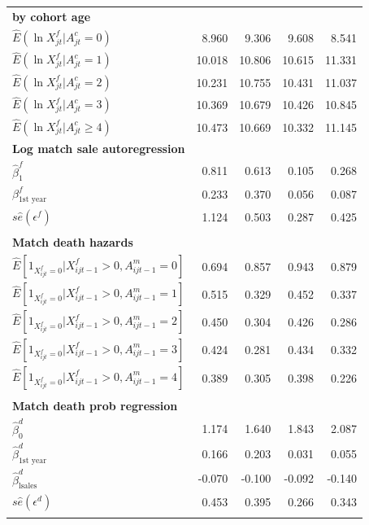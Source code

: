 \begin{small}
\begin{longtable}{l|rrrr}
\textbf{by cohort age } &  &  &  &  \\ 
$\widehat{E}(\ln X_{jt}^{f}|A_{jt}^{c}=0)$ & 8.960 & 9.306 & 9.608 & 8.541
\\ 
$\widehat{E}(\ln X_{jt}^{f}|A_{jt}^{c}=1)$ & 10.018 & 10.806 & 10.615 & 
11.331 \\ 
$\widehat{E}(\ln X_{jt}^{f}|A_{jt}^{c}=2)$ & 10.231 & 10.755 & 10.431 & 
11.037 \\ 
$\widehat{E}(\ln X_{jt}^{f}|A_{jt}^{c}=3)$ & 10.369 & 10.679 & 10.426 & 
10.845 \\ 
$\widehat{E}(\ln X_{jt}^{f}|A_{jt}^{c}\geq 4)$ & 10.473 & 10.669 & 10.332 & 
11.145 \\
\textbf{Log match sale autoregression} &  &  &  &  \\ 
$\widehat{\beta }_{1}^{f}$ & 0.811 & 0.613 & 0.105 & 0.268 \\ 
$\beta _{\mbox{1st
year}}^{f}$ & 0.233 & 0.370 & 0.056 & 0.087 \\ 
$s\widehat{e}(\epsilon ^{f})$ & 1.124 & 0.503 & 0.287 & 0.425 \\ 
&  &  &  &  \\ 
\textbf{Match death hazards} &  &  &  &  \\ 
$\widehat{E}[1_{X_{ijt}^{f}=0}|X_{ijt-1}^{f}>0,A_{ijt-1}^{m}=0]$ & 0.694 & 
0.857 & 0.943 & 0.879 \\ 
$\widehat{E}[1_{X_{ijt}^{f}=0}|X_{ijt-1}^{f}>0,A_{ijt-1}^{m}=1]$ & 0.515 & 
0.329 & 0.452 & 0.337 \\ 
$\widehat{E}[1_{X_{ijt}^{f}=0}|X_{ijt-1}^{f}>0,A_{ijt-1}^{m}=2]$ & 0.450 & 
0.304 & 0.426 & 0.286 \\ 
$\widehat{E}[1_{X_{ijt}^{f}=0}|X_{ijt-1}^{f}>0,A_{ijt-1}^{m}=3]$ & 0.424 & 
0.281 & 0.434 & 0.332 \\ 
$\widehat{E}[1_{X_{ijt}^{f}=0}|X_{ijt-1}^{f}>0,A_{ijt-1}^{m}=4]$ & 0.389 & 
0.305 & 0.398 & 0.226 \\ 
\multicolumn{1}{r}{} &  &  &  &  \\ 
\textbf{Match death prob regression} &  &  &  &  \\ 
$\widehat{\beta }_{0}^{d}$ & 1.174 & 1.640 & 1.843 & 2.087 \\ 
$\widehat{\beta }_{\mbox{1st year}}^{d}$ & 0.166 & 0.203 & 0.031 & 0.055 \\ 
$\widehat{\beta }_{\mbox{lsales}}^{d}$ & -0.070 & -0.100 & -0.092 & -0.140
\\ 
$s\widehat{e}(\epsilon ^{d})$ & 0.453 & 0.395 & 0.266 & 0.343 \\ 
\multicolumn{1}{r}{} &  &  &  &  \\ 

\end{longtable}
\end{small}
